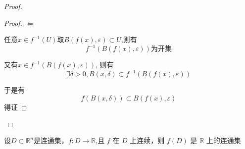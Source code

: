 \documentclass[lang=cn,10pt]{elegantbook}
\begin{document}
\begin{proof}
\begin{proof}
			$\Leftarrow$
			
			任意$x\in f^{-1}(U)$取$B(f(x),\varepsilon) \subset U$,则有
			\begin{equation*}
				f^{-1}(B(f(x),\varepsilon)) \text{为开集}
			\end{equation*}
			
			又有$x\in f^{-1}(B(f(x),\varepsilon))$,
			则有
			\begin{equation*}
				\exists \delta>0,B(x,\delta)\subset f^{-1}(B(f(x),\varepsilon))
			\end{equation*}
			
			于是有
			\begin{equation*}
				f(B(x,\delta))\subset B(f(x),\varepsilon)
			\end{equation*}
			得证
		\end{proof}
	\end{proof}
	\begin{theorem}
		$\text{设}D\subset \mathbb{R} ^n$是连通集，$f:D\rightarrow \mathbb{R}$,且 $f$ 在 $D$ 上连续，则
		$f(D)$ 是 $\mathbb{R}$ 上的连通集
	\end{theorem}
\end{document}
